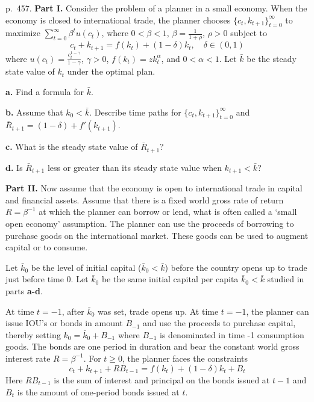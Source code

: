 \documentclass[12pt, letterpaper]{article}
\begin{document}
\begin{tcolorbox}[evenbox,title={Exercise 11.6 \quad Trade and growth}]
\begin{tcolorbox}[questionbox]
p.~457. \textbf{Part I.} Consider the problem of a planner in a small economy. When the economy is closed to
international trade, the planner chooses $\{c_t,k_{t+1}\}_{t=0}^\infty$ to maximize $\sum_{t=0}^\infty\beta^tu(c_t)$, where
$0<\beta<1$, $\beta=\frac1{1+\rho}$, $\rho>0$ subject to
\[
c_t+k_{t+1}=f(k_t)+(1-\delta)k_t,\quad\delta\in(0,1)
\]
where $u(c_t)=\frac{c_t^{1-\gamma}}{1-\gamma}$, $\gamma>0$, $f(k_t)=zk_t^\alpha$, and $0<\alpha<1$. Let $\bar k$ be the
steady state value of $k_t$ under the optimal plan.

\textbf{a.} Find a formula for $\bar k$.

\textbf{b.} Assume that $k_0<\bar k$. Describe time paths for $\{c_t,k_{t+1}\}_{t=0}^\infty$ and
$\bar R_{t+1}=(1-\delta)+f'(k_{t+1})$.

\textbf{c.} What is the steady state value of $\bar R_{t+1}$?

\textbf{d.} Is $\bar R_{t+1}$ less or greater than its steady state value when $k_{t+1}<\bar k$?

\textbf{Part II.} Now assume that the economy is open to international trade in capital and financial assets. Assume that
there is a fixed world gross rate of return $R=\beta^{-1}$ at which the planner can borrow or lend, what is often called a
`small open economy' assumption. The planner can use the proceeds of borrowing to purchase goods on the international
market. These goods can be used to augment capital or to consume.

Let $\bar k_0$ be the level of initial capital ($\bar k_0<\bar k$) before the country opens up to trade just before time
0. Let $\bar k_0$ be the same initial capital per capita $\bar k_0<\bar k$ studied in parts \textbf{a-d}.

At time $t=-1$, after $\bar k_0$ was set, trade opens up. At time $t=-1$, the planner can issue IOU's or bonds in amount
$B_{-1}$ and use the proceeds to purchase capital, thereby setting $k_0=\bar k_0+B_{-1}$ where $B_{-1}$ is denominated in
time -1 consumption goods. The bonds are one period in duration and bear the constant world gross interest rate
$R=\beta^{-1}$. For $t\ge0$, the planner faces the constraints
\[
c_t+k_{t+1}+RB_{t-1}=f(k_t)+(1-\delta)k_t+B_t
\]
Here $RB_{t-1}$ is the sum of interest and principal on the bonds issued at $t-1$ and $B_t$ is the amount of one-period
bonds issued at $t$.


\end{tcolorbox}
\end{tcolorbox}
\end{document}
